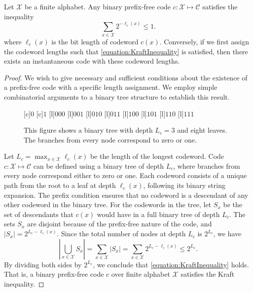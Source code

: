 \begin{theorem}
Let $\mathcal{X}$ be a finite alphabet.
Any binary prefix-free code $c : \mathcal{X} \mapsto \mathcal{C}$ satisfies the inequality
\begin{equation} \label{equation:KraftInequality}
\sum_{x \in \mathcal{X}} 2^{-\ell_c(x)} \leq 1.
\end{equation}
where $\ell_c(x)$ is the bit length of codeword $c(x)$.
Conversely, if we first assign the codeword lengths such that \eqref{equation:KraftInequality} is satisfied, then there exists an instantaneous code with these codeword lengths.
\end{theorem}
\begin{proof}
We wish to give necessary and sufficient conditions about the existence of a prefix-free code with a specific length assignment.
We employ simple combinatorial arguments to a binary tree structure to establish this result.
\begin{figure}[htbp]
\begin{center}
\begin{psfrags}
[c]{$0$}
[c]{$1$}
[l]{$000$}
[l]{$001$}
[l]{$010$}
[l]{$011$}
[l]{$100$}
[l]{$101$}
[l]{$110$}
[l]{$111$}
\end{psfrags}
\caption{This figure shows a binary tree with depth $L_c = 3$ and eight leaves.  The branches from every node correspond to zero or one.}
\label{figure:BinaryTree}
\end{center}
\end{figure}
Let $L_c = \max_{x \in \mathcal{X}} \ell_c (x)$ be the length of the longest codeword.
Code $c: \mathcal{X} \mapsto \mathcal{C}$ can be defined using a binary tree of depth $L_c$, where branches from every node correspond either to zero or one.
Each codeword consists of a unique path from the root to a leaf at depth $\ell_c(x)$, following its binary string expansion.
The prefix condition ensures that no codeword is a descendant of any other codeword in the binary tree.
For the codewords in the tree, let $S_x$ be the set of descendants that $c(x)$ would have in a full binary tree of depth $L_c$.
The sets $S_x$ are disjoint because of the prefix-free nature of the code, and $|S_x| = 2^{L_c - \ell_c(x)}$.
Since the total number of nodes at depth $L_c$ is $2^{L_c}$, we have
\begin{equation*}
\left| \bigcup_{x \in \mathcal{X}} S_x \right|
= \sum_{x \in \mathcal{X}} |S_x|
= \sum_{x \in \mathcal{X}} 2^{L_c - \ell_c(x)}
\leq 2^{L_c} .
\end{equation*}
By dividing both sides by $2^{L_c}$, we conclude that \eqref{equation:KraftInequality} holds.
That is, a binary prefix-free code $c$ over finite alphabet $\mathcal{X}$ satisfies the Kraft inequality.


\end{proof}
